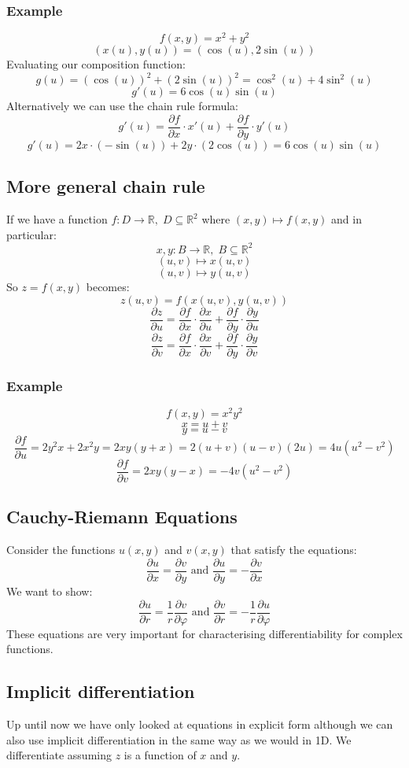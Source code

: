 \documentclass[12pt]{article}
\newcommand{\pf}[2]{\frac{\partial #1}{\partial #2}}
\begin{document}
\subsubsection*{Example}
\[f(x,y)=x^2+y^2\]
\[(x(u),y(u))=(\cos(u),2\sin(u))\]
Evaluating our composition function:
\[g(u)=(\cos(u))^2+(2\sin(u))^2=\cos^2(u)+4\sin^2(u)\]
\[g'(u)=6\cos(u)\sin(u)\]
Alternatively we can use the chain rule formula:
\[g'(u)=\frac{\partial f}{\partial x}\cdot x'(u)+\frac{\partial f}{\partial y}\cdot y'(u)\]
\[g'(u)=2x\cdot(-\sin(u))+2y\cdot(2\cos(u))=6\cos(u)\sin(u)\]
\subsection*{More general chain rule}
If we have a function \(f:D\to\mathbb{R},\;D\subseteq\mathbb{R}^2\) where \((x,y)\mapsto f(x,y)\) and in particular:
\[x,y:B\to\mathbb{R},\;B\subseteq\mathbb{R}^2\]
\[(u,v)\mapsto x(u,v)\]
\[(u,v)\mapsto y(u,v)\]
So \(z=f(x,y)\) becomes:
\[z(u,v)=f(x(u,v),y(u,v))\]
\[\frac{\partial z}{\partial u}=\frac{\partial f}{\partial x}\cdot \frac{\partial x}{\partial u}+\frac{\partial f}{\partial y}\cdot \frac{\partial y}{\partial u}\]
\[\frac{\partial z}{\partial v}=\frac{\partial f}{\partial x}\cdot \frac{\partial x}{\partial v}+\frac{\partial f}{\partial y}\cdot \frac{\partial y}{\partial v}\]
\subsubsection*{Example}
\[f(x,y)=x^2y^2\]
\[x=u+v\]
\[y=u-v\]
\[\pf{f}{u}=2y^2x+2x^2y=2xy(y+x)=2(u+v)(u-v)(2u)=4u(u^2-v^2)\]
\[\pf{f}{v}=2xy(y-x)=-4v(u^2-v^2)\]
\subsection*{Cauchy-Riemann Equations}
Consider the functions \(u(x,y)\) and \(v(x,y)\) that satisfy the equations:
\[\pf{u}{x}=\pf{v}{y}\text{ and }\pf{u}{y}=-\pf{v}{x}\]
We want to show:
\[\pf{u}{r}=\frac{1}{r}\pf{v}{\varphi}\text{ and }\pf{v}{r}=-\frac{1}{r}\pf{u}{\varphi}\]
These equations are very important for characterising differentiability for complex functions.
\subsection*{Implicit differentiation}
Up until now we have only looked at equations in explicit form although we can also use implicit differentiation in the same way as we would in 1D. We differentiate assuming \(z\) is a function of \(x\) and \(y\).
\end{document}
